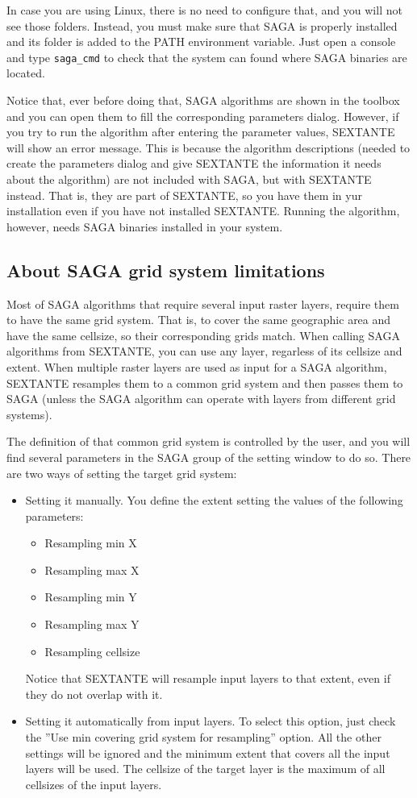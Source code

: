 In case you are using Linux, there is no need to configure that, and you will not see those folders. Instead, you must make sure that SAGA is properly installed and its folder is added to the PATH environment variable. Just open a console and type \texttt{saga\_cmd} to check that the system can found where SAGA binaries are located.

Notice that, ever before doing that, SAGA algorithms are shown in the toolbox and you can open them to fill the corresponding parameters dialog. However, if you try to run the algorithm after entering the parameter values, SEXTANTE will show an error message. This is because the algorithm descriptions (needed to create the parameters dialog and give SEXTANTE the information it needs about the algorithm) are not included with SAGA, but with SEXTANTE instead. That is, they are part of SEXTANTE, so you have them in yur installation even if you have not installed SEXTANTE. Running the algorithm, however, needs SAGA binaries installed in your system.

\subsection{About SAGA grid system limitations}

Most of SAGA algorithms that require several input raster layers, require them to have the same grid system. That is, to cover the same geographic area and have the same cellsize, so their corresponding grids match. When calling SAGA algorithms from SEXTANTE, you can use any layer, regarless of its cellsize and extent. When multiple raster layers are used as input for a SAGA algorithm, SEXTANTE resamples them to a common grid system and then passes them to SAGA (unless the SAGA algorithm can operate with layers from different grid systems).

The definition of that common grid system is controlled by the user, and you will find several parameters in the SAGA group of the setting window to do so. There are two ways of setting the target grid system:

\begin{itemize}
	\item{Setting it manually}. You define the extent setting the values of the following parameters:
	\begin{itemize}
		\item Resampling min X
		\item Resampling max X
		\item Resampling min Y
		\item Resampling max Y
		\item Resampling cellsize
	\end{itemize}
	Notice that SEXTANTE will resample input layers to that extent, even if they do not overlap with it.
	\item Setting it automatically from input layers. To select this option, just check the ''Use min covering grid system for resampling'' option. All the other settings will be ignored and the minimum extent that covers all the input layers will be used. The cellsize of the target layer is the maximum of all cellsizes of the input layers.
\end{itemize}


